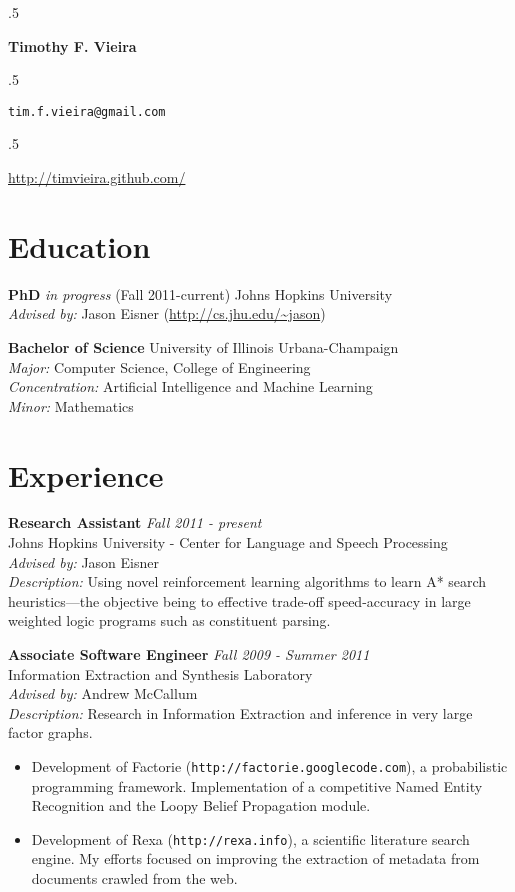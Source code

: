 \documentclass{report}
\newcommand{\centerheader}[1]{\moveleft.5\hoffset\centerline{#1}}
\begin{document}
{\vskip 0.1in}

{
  {\vskip 0.2in}
  \centerheader{\Large \bf Timothy F. Vieira}
  {\par
    {\vskip 0.1in}
    \centerheader{\texttt{tim.f.vieira@gmail.com}}
    \centerheader{\url{http://timvieira.github.com/}}
  }
  {\vskip 0.1in}
}
{\vskip -0.20in}


\section*{Education} 
{\bf PhD} \emph{in progress} (Fall 2011-current) Johns Hopkins University \\
{\sl Advised by:} Jason Eisner (\url{http://cs.jhu.edu/~jason})

{\bf Bachelor of Science} University of Illinois Urbana-Champaign \\
{\sl Major:} Computer Science, College of Engineering \\
{\sl Concentration:} Artificial Intelligence and Machine Learning \\
{\sl Minor:} Mathematics

\section*{Experience}
{\bf Research Assistant} \hfill {\it Fall 2011 - present} \\
Johns Hopkins University - Center for Language and Speech Processing \\
{\sl Advised by:} Jason Eisner \\
{\sl Description:} Using novel reinforcement learning algorithms to learn A* search heuristics---the objective being to effective trade-off speed-accuracy in large weighted logic programs such as constituent parsing.

{\bf Associate Software Engineer} \hfill {\it Fall 2009 - Summer 2011} \\
Information Extraction and Synthesis Laboratory \\
{\sl Advised by:} Andrew McCallum \\
{\sl Description:} Research in Information Extraction and inference in very large factor graphs. 
\begin{itemize}
\item Development of Factorie (\texttt{http://factorie.googlecode.com}), a probabilistic programming framework. Implementation of a competitive Named Entity Recognition and the Loopy Belief Propagation module. 
\item Development of Rexa (\texttt{http://rexa.info}), a scientific literature search engine. My efforts focused on improving the extraction of metadata from documents crawled from the web.
\end{itemize}
\end{document}
